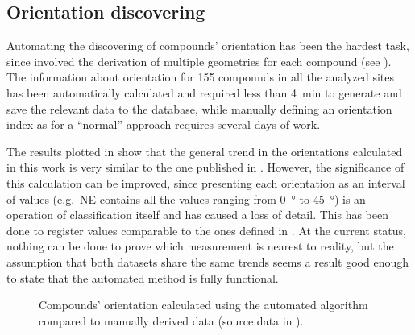 
        \subsection{Orientation discovering}

            Automating the discovering of compounds' orientation has been the hardest task, since involved the derivation of multiple geometries for each compound (see ).
            The information about orientation for 155 compounds in all the analyzed sites has been automatically calculated and required less than \SI{4}{\minute} to generate and save the relevant data to the database, while manually defining an orientation index as for a ``normal'' approach requires several days of work.
            
            The results plotted in  show that the general trend in the orientations calculated in this work is very similar to the one published in \cite{laterza}. However, the significance of this calculation can be improved, since presenting each orientation as an interval of values (e.g.\ NE contains all the values ranging from \SI{0}{\degree} to \SI{45}{\degree}) is an operation of classification itself and has caused a loss of detail. This has been done to register values comparable to the ones defined in \cite{laterza}. At the current status, nothing can be done to prove which measurement is nearest to reality, but the assumption that both datasets share the same trends seems a result good enough to state that the automated method is fully functional.

            \begin{figure}[H]
                \centering
                \begin{tikzpicture}
                    
                \end{tikzpicture}
                \caption[Orientation of compounds for all the settlements calculated in this work compared with know data]{Compounds' orientation calculated using the automated algorithm compared to manually derived data (source data in ).}
                \label{fig:graph-orient}
            \end{figure}

